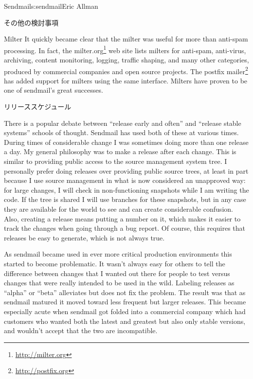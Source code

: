 \begin{aosachapter}{Sendmail}{s:sendmail}{Eric Allman}
\begin{aosasect1}{その他の検討事項}
\begin{aosasect2}{Milter}
It quickly became clear that the milter was useful for more than
anti-spam processing. In fact, the milter.org\footnote{\url{http://milter.org}}
web site lists milters
for anti-spam, anti-virus, archiving, content monitoring, logging,
traffic shaping, and many other categories, produced by commercial
companies and open source projects. The postfix
mailer\footnote{\url{http://postfix.org}}
has added
support for milters using the same interface. Milters have proven to
be one of sendmail's great successes.

\end{aosasect2}

\begin{aosasect2}{リリーススケジュール}

There is a popular debate between ``release early and often'' and
``release stable systems'' schools of thought. Sendmail has used both
of these at various times. During times of considerable change I was
sometimes doing more than one release a day. My general philosophy was
to make a release after each change. This is similar to providing
public access to the source management system tree. I personally
prefer doing releases over providing public source trees, at least in
part because I use source management in what is now considered an
unapproved way: for large changes, I will check in non-functioning
snapshots while I am writing the code. If the tree is shared I will
use branches for these snapshots, but in any case they are available
for the world to see and can create considerable confusion. Also,
creating a release means putting a number on it, which makes it easier
to track the changes when going through a bug report.
Of course, this requires that releases be easy to generate,
which is not always true.

As sendmail became used in ever more critical production environments
this started to become problematic. It wasn't always easy for others
to tell the difference between changes that I wanted out there for
people to test versus changes that were really intended to be used in
the wild. Labeling releases as ``alpha'' or ``beta'' alleviates but
does not fix the problem. The result was that as sendmail matured it
moved toward less frequent but larger releases. This became especially
acute when sendmail got folded into a commercial company which had
customers who wanted both the latest and greatest but also only stable
versions, and wouldn't accept that the two are incompatible.


\end{aosasect2}
\end{aosasect1}
\end{aosachapter}
